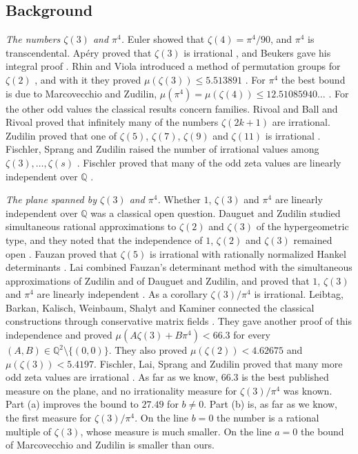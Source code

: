 \documentclass[11pt]{amsart}
\theoremstyle{definition}
\theoremstyle{remark}
\numberwithin{equation}{section}
\newcommand{\Q}{\mathbb Q}
\begin{document}
\subsection{Background}\label{ssec:background}
\emph{The numbers $\zeta(3)$ and $\pi^4$.} Euler showed that $\zeta(4)=\pi^4/90$, and $\pi^4$ is
transcendental. Ap\'ery proved that $\zeta(3)$ is irrational \cite{Apery79}, and Beukers gave his integral proof
\cite{Beukers79}. Rhin and Viola introduced a method of permutation groups for $\zeta(2)$ \cite{RhinViola96}, and
with it they proved $\mu(\zeta(3))\le5.513891$ \cite{RhinViola01}. For $\pi^4$
the best bound is due to Marcovecchio and Zudilin, $\mu(\pi^4)=\mu(\zeta(4))\le12.51085940\ldots$ \cite{MarcovecchioZudilin20}.
For the other odd values the classical results concern families. Rivoal \cite{Rivoal00} and Ball and Rivoal
\cite{BallRivoal01} proved that infinitely many of the numbers $\zeta(2k+1)$ are irrational. Zudilin proved that
one of $\zeta(5)$, $\zeta(7)$, $\zeta(9)$ and $\zeta(11)$ is irrational \cite{Zudilin01,Zudilin04}. Fischler, Sprang
and Zudilin raised the number of irrational values among $\zeta(3),\dots,\zeta(s)$ \cite{FSZ19}. Fischler proved that
many of the odd zeta values are linearly independent over $\Q$ \cite{Fischler26}.

\emph{The plane spanned by $\zeta(3)$ and $\pi^4$.} Whether $1$, $\zeta(3)$ and $\pi^4$ are linearly
independent over $\Q$ was a classical open question. Dauguet and Zudilin studied simultaneous rational
approximations to $\zeta(2)$ and $\zeta(3)$ of the hypergeometric type, and they noted that the independence of $1$,
$\zeta(2)$ and $\zeta(3)$ remained open \cite{DauguetZudilin14}. Fauzan proved that $\zeta(5)$ is irrational with
rationally normalized Hankel determinants \cite{Fauzan2026}. Lai combined Fauzan's determinant method with the
simultaneous approximations of Zudilin and of Dauguet and Zudilin, and proved that $1$, $\zeta(3)$ and $\pi^4$ are
linearly independent \cite{Lai2026}. As a corollary $\zeta(3)/\pi^4$ is irrational. Leibtag, Barkan, Kalisch,
Weinbaum, Shalyt and Kaminer connected the classical constructions through conservative matrix fields
\cite{LBKWSK26}. They gave another proof of this independence and proved $\mu(A\zeta(3)+B\pi^4)<66.3$ for every
$(A,B)\in\Q^2\setminus\{(0,0)\}$. They also proved $\mu(\zeta(2))<4.62675$ and $\mu(\zeta(3))<5.4197$. Fischler, Lai,
Sprang and Zudilin proved that many more odd zeta values are irrational \cite{FLSZ26}. As far as we know, $66.3$ is
the best published measure on the plane, and no irrationality measure for $\zeta(3)/\pi^4$ was known. Part (a)
improves the bound to $27.49$ for $b\ne0$. Part (b) is, as far as we know, the first measure for $\zeta(3)/\pi^4$. On the line $b=0$ the number is a rational multiple of $\zeta(3)$, whose
measure is much smaller. On the line $a=0$ the bound of Marcovecchio and Zudilin is smaller than ours.
\end{document}
